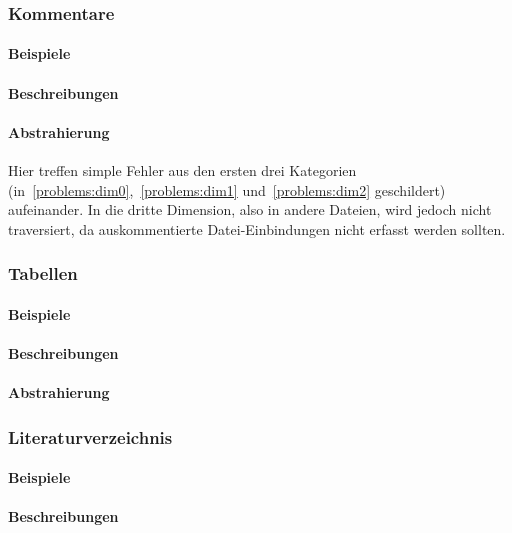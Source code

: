 \subsubsection{Kommentare}
\paragraph*{Beispiele}
\paragraph*{Beschreibungen}
\paragraph*{Abstrahierung}
Hier treffen simple Fehler aus den ersten drei Kategorien (in~\ref{problems:dim0},~\ref{problems:dim1} und~\ref{problems:dim2} geschildert) aufeinander. In die dritte Dimension, also in andere Dateien, wird jedoch nicht traversiert, da auskommentierte Datei-Einbindungen nicht erfasst werden sollten. 


\subsubsection{Tabellen}\label{problems:tables}
\paragraph*{Beispiele}
\paragraph*{Beschreibungen}
\paragraph*{Abstrahierung}

\subsubsection{Literaturverzeichnis}\label{problems:bibtex}
\paragraph*{Beispiele}
\paragraph*{Beschreibungen}
